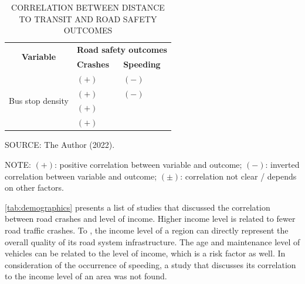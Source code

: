 \begin{table}[!hbtp]
    \footnotesize
    \captionsetup{justification=raggedright,
        singlelinecheck=false,
        font=footnotesize}
    \caption{CORRELATION BETWEEN DISTANCE TO TRANSIT AND ROAD SAFETY OUTCOMES}
    \centering
    \begin{tabular}{p{2.5cm}p{6.2cm}p{6.2cm}}
        \hline
        \multicolumn{1}{c}{\multirow{2}{2.5cm}{\textbf{Variable}}} & \multicolumn{2}{c}{\textbf{Road safety outcomes}} \\
        \multicolumn{1}{c}{} & \textbf{Crashes} & \textbf{Speeding} \\ \hline
        \multirow{4}{2.5cm}{Bus stop density}  
         & $(+)$ \textcite{Obelheiro2020} & $(-)$ \textcite{Bansal2014} \\
         & $(+)$ \textcite{Ouyang2014} &  $(-)$ \textcite{Koshy2005} \\
         & $(+)$ \textcite{Wei2013} &  \\ 
         & $(+)$ \textcite{Kim2010} &  \\ \hline
    \end{tabular}
    \label{tab:distance}
    \par \vspace{2mm} \footnotesize \raggedright
    SOURCE: The Author (2022).
    \par \vspace{1mm} \footnotesize \raggedright
    NOTE: $(+)$: positive correlation between variable and outcome; $(-)$: inverted correlation between variable and outcome; $(\pm)$: correlation not clear / depends on other factors.
\end{table}

\autoref{tab:demographics} presents a list of studies that discussed the correlation between road crashes and level of income. Higher income level is related to fewer road traffic crashes. To \textcite{Obelheiro2019}, the income level of a region can directly represent the overall quality of its road system infrastructure. The age and maintenance level of vehicles can be related to the level of income, which is a risk factor as well. In consideration of the occurrence of speeding, a study that discusses its correlation to the income level of an area was not found. 

